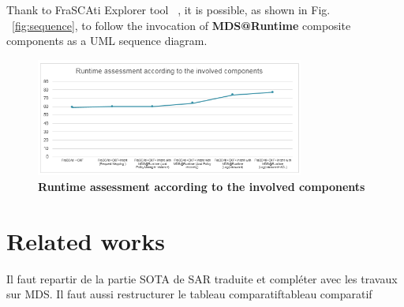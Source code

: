 \documentclass[runningheads,a4paper]{llncs}
\begin{document}
Thank to FraSCAti Explorer tool ~\cite{SMF09}, it is possible, as shown in Fig. ~\ref{fig:sequence}, to follow the invocation of  \textbf{MDS@Runtime} composite components as a UML sequence diagram.


\begin{figure}[ht]  
\centering
\includegraphics[height=110pt, width=250pt]{runtimeAssessment.PNG}
\caption{\textbf{Runtime assessment according to the involved components
}}
\label{fig:SecaaS}
\end{figure}


\section{Related works}

Il faut repartir de la partie SOTA de SAR traduite et compl\'eter avec les travaux sur MDS. Il faut aussi restructurer le tableau comparatiftableau comparatif
\end{document}
